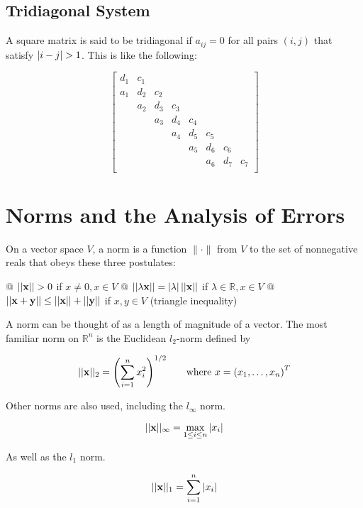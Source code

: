     \subsection{Tridiagonal System}
    A square matrix is said to be tridiagonal if $a_{ij} = 0$ for all pairs $(i, j)$ that satisfy $\left\lvert i - j \right\rvert > 1$.
    This is like the following:

    \[
        \left[
        \begin{array}{cccccccc}
            d_1 & c_1 & & & & & & \\
            a_1 & d_2 & c_2 & & & & & \\
                & a_2 & d_3 & c_3 & & & & \\
                &     & a_3 & d_4 & c_4 & & & \\
                &     &     & a_4 & d_5 & c_5 & & \\
                &     &     &     & a_5 & d_6 & c_6 & \\
                &     &     &     &     & a_6 & d_7 & c_7\\
        \end{array}
        \right]
    \]

\section{Norms and the Analysis of Errors}
On a vector space $V$, a norm is a function $\lVert \cdot \rVert$ from $V$ to the set of nonnegative reals that obeys
these three postulates:

\begin{easylist}[itemize]
        @ $ \lvert \lvert \mathbf{x} \rvert \rvert >  0$ if $x \neq 0, x \in V$
        @ $\lvert \lvert \mathbf{\lambda x} \rvert \rvert = \left\lvert \lambda \right\rvert \lvert \lvert \mathbf{x} \rvert \rvert$ if $\lambda \in \mathbb{R}, x \in V$
        @ $\lvert \lvert \mathbf{x + y} \rvert \rvert \le \lvert \lvert \mathbf{x} \rvert \rvert + \lvert \lvert \mathbf{y} \rvert \rvert$ if $x, y \in V$ (triangle inequality)
\end{easylist}

A norm can be thought of as a length of magnitude of a vector. The most familiar norm on $\mathbb{R}^n$ is the Euclidean
$l_2$-norm defined by

\[ \lvert \lvert \mathbf{x} \rvert \rvert_2 = {\left( \sum_{i = 1}^n x_i^2 \right)}^{1/2} \qquad \text{where } x={(x_1, \ldots, x_n)}^T \]

Other norms are also used, including the $l_\infty$ norm.

\[ \lvert \lvert \mathbf{x} \rvert \rvert_\infty = \max_{1 \le i \le n} \left\lvert x_i \right\rvert \]

As well as the $l_1$ norm.

\[ \lvert \lvert \mathbf{x} \rvert \rvert_1 = \sum_{i = 1}^n \left\lvert x_i \right\rvert \]

